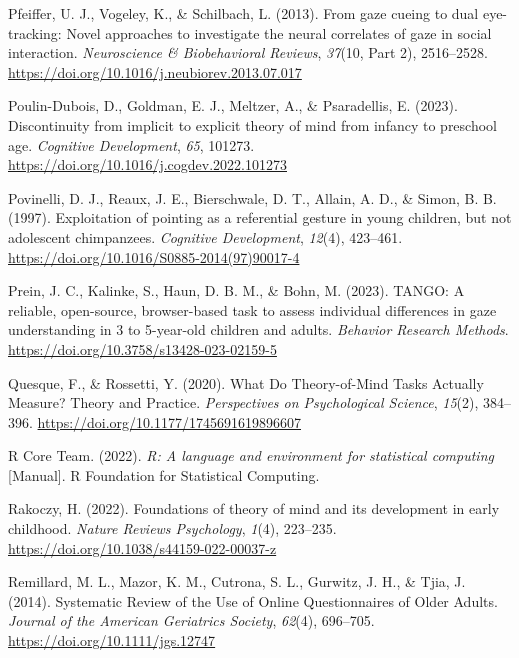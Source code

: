 \documentclass[
  man,mask,floatsintext]{apa7}
\newlength{\cslhangindent}
\newlength{\cslentryspacingunit} %
\newenvironment{CSLReferences}[2] %
 {%
  \setlength{\parindent}{0pt}
  \ifodd #1
  \let\oldpar\par
  \def\par{\hangindent=\cslhangindent\oldpar}
  \fi
  \setlength{\parskip}{#2\cslentryspacingunit}
 }%
 {}
\begin{document}
\begin{CSLReferences}{1}{0}
\leavevmode{}%
Pfeiffer, U. J., Vogeley, K., \& Schilbach, L. (2013). From gaze cueing to dual eye-tracking: {Novel} approaches to investigate the neural correlates of gaze in social interaction. \emph{Neuroscience \& Biobehavioral Reviews}, \emph{37}(10, Part 2), 2516--2528. \url{https://doi.org/10.1016/j.neubiorev.2013.07.017}

\leavevmode{}%
Poulin-Dubois, D., Goldman, E. J., Meltzer, A., \& Psaradellis, E. (2023). Discontinuity from implicit to explicit theory of mind from infancy to preschool age. \emph{Cognitive Development}, \emph{65}, 101273. \url{https://doi.org/10.1016/j.cogdev.2022.101273}

\leavevmode{}%
Povinelli, D. J., Reaux, J. E., Bierschwale, D. T., Allain, A. D., \& Simon, B. B. (1997). Exploitation of pointing as a referential gesture in young children, but not adolescent chimpanzees. \emph{Cognitive Development}, \emph{12}(4), 423--461. \url{https://doi.org/10.1016/S0885-2014(97)90017-4}

\leavevmode{}%
Prein, J. C., Kalinke, S., Haun, D. B. M., \& Bohn, M. (2023). {TANGO}: {A} reliable, open-source, browser-based task to assess individual differences in gaze understanding in 3 to 5-year-old children and adults. \emph{Behavior Research Methods}. \url{https://doi.org/10.3758/s13428-023-02159-5}

\leavevmode{}%
Quesque, F., \& Rossetti, Y. (2020). What {Do Theory-of-Mind Tasks Actually Measure}? {Theory} and {Practice}. \emph{Perspectives on Psychological Science}, \emph{15}(2), 384--396. \url{https://doi.org/10.1177/1745691619896607}

\leavevmode{}%
R Core Team. (2022). \emph{R: {A} language and environment for statistical computing} {[}Manual{]}. R Foundation for Statistical Computing.

\leavevmode{}%
Rakoczy, H. (2022). Foundations of theory of mind and its development in early childhood. \emph{Nature Reviews Psychology}, \emph{1}(4), 223--235. \url{https://doi.org/10.1038/s44159-022-00037-z}

\leavevmode{}%
Remillard, M. L., Mazor, K. M., Cutrona, S. L., Gurwitz, J. H., \& Tjia, J. (2014). Systematic {Review} of the {Use} of {Online Questionnaires} of {Older Adults}. \emph{Journal of the American Geriatrics Society}, \emph{62}(4), 696--705. \url{https://doi.org/10.1111/jgs.12747}


\end{CSLReferences}
\end{document}
